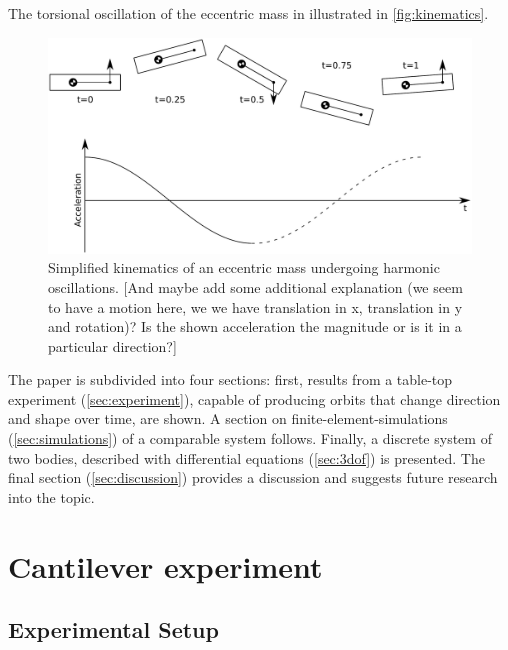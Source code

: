 \documentclass{article}
\begin{document}
The torsional oscillation of the eccentric mass in illustrated in \autoref{fig:kinematics}.

\begin{figure}[ht!]
    \centering
    \includegraphics[width=0.7\linewidth]{figures/kinematics_2.pdf}
    \caption{Simplified kinematics of an eccentric mass undergoing harmonic oscillations. [And maybe add some additional explanation (we seem to have a motion here, we we have translation in x, translation in y and rotation)? Is the shown acceleration the magnitude or is it in a particular direction?]}
    \label{fig:kinematics}
\end{figure}

The paper is subdivided into four sections: first, results from a table-top experiment (\autoref{sec:experiment}), capable of producing orbits that change direction and shape over time, are shown. A section on finite-element-simulations (\autoref{sec:simulations}) of a comparable system follows. Finally, a discrete system of two bodies, described with differential equations (\autoref{sec:3dof}) is presented. The final section (\autoref{sec:discussion}) provides a discussion and suggests future research into the topic. 

\clearpage

\section{Cantilever experiment}
\label{sec:experiment}

\subsection{Experimental Setup}
\end{document}
